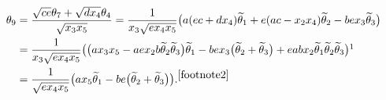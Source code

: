 \documentclass[pdftex]{sigma}
\newcommand{\til}[0]{\widetilde{\theta}}
\numberwithin{equation}{section}
\begin{document}
{\begin{align*}
 \theta_9 &= \frac{\sqrt{ce} \theta_7 + \sqrt{dx_4} \theta_4}{\sqrt{x_3x_5}}
 = \frac{1}{x_3 \sqrt{ex_4x_5}} \big( a(ec+dx_4) {\widetilde{\theta}_1} + e(ac-x_2x_4) \widetilde{\theta}_2 - be x_3 \widetilde{\theta}_3 \big) \\
 &= {\frac{1}{x_3 \sqrt{ex_4x_5}} \big( \big(a x_3x_5 - aex_2b \til_2\til_3 \big) \widetilde{\theta}_1 - bex_3 \big(\widetilde{\theta}_2 + \widetilde{\theta}_3\big) + eabx_2 \widetilde{\theta}_1 \widetilde{\theta}_2 \widetilde{\theta}_3 \big) }\footnotemark \\
 &= {\frac{1}{\sqrt{ex_4x_5}} \big( a x_5 \widetilde{\theta}_1 - be \big(\widetilde{\theta}_2 + \widetilde{\theta}_3\big) \big). }{}^{\ref{footnote2}}
\end{align*}

}
\end{document}
